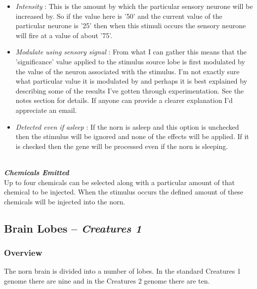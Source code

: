 \documentclass[11pt,twoside,a4paper]{article}
\begin{document}
\begin{itemize}
\item[] \emph{Intensity} : This is the amount by which the particular sensory neurone will be increased by. So if the value here is '50' and the current value of the particular neurone is '25' then when this stimuli occurs the sensory neurone will fire at a value of about '75'.
\item[] \emph{Modulate using sensory signal} : From what I can gather this means that the 'significance' value applied to the stimulus source lobe is first modulated by the value of the neuron associated with the stimulus. I'm not exactly sure what particular value it is modulated by and perhaps it is best explained by describing some of the results I've gotten through experimentation. See the notes section for details. If anyone can provide a clearer explanation I'd appreciate an email.
\item[] \emph{Detected even if asleep} : If the norn is asleep and this option is unchecked then the stimulus will be ignored and none of the effects will be applied. If it is checked then the gene will be processed even if the norn is sleeping.
\end{itemize}~\\

\textbf{\textit{Chemicals Emitted}}~\\
Up to four chemicals can be selected along with a particular amount of that chemical to be injected. When the stimulus occurs the defined amount of these chemicals will be injected into the norn.

\clearpage


\subsection{Brain Lobes -- \textit{Creatures 1}} %


\subsubsection{Overview}

The norn brain is divided into a number of lobes. In the standard Creatures 1 genome there are nine and in the Creatures 2 genome there are ten.~\\
\end{document}
